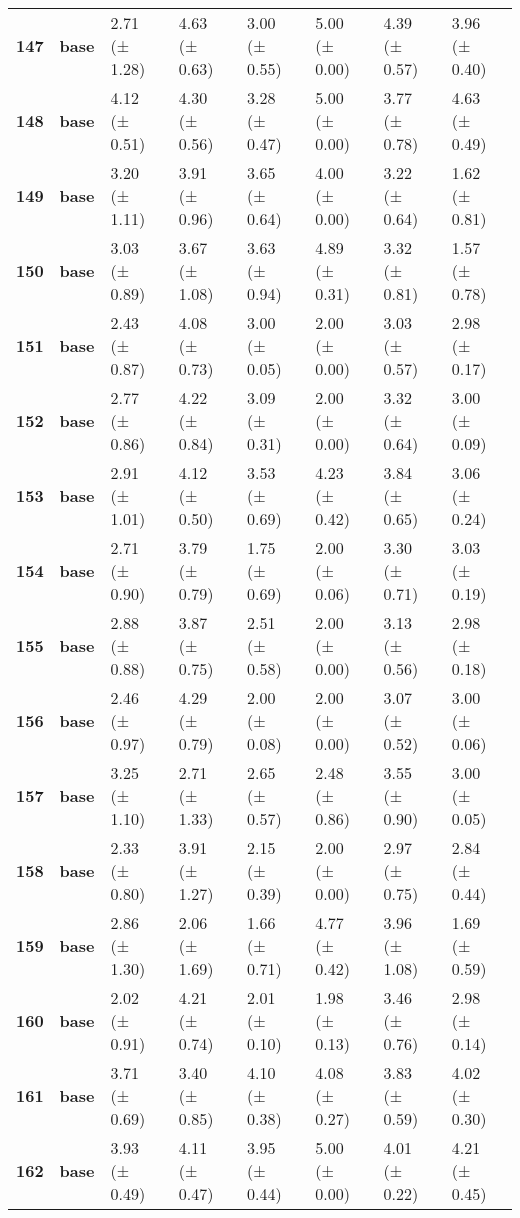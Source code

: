 \begin{longtable}{llllllll}
\cline{1-8}
\textbf{147} & \textbf{base} & 2.71 (± 1.28) & 4.63 (± 0.63) & 3.00 (± 0.55) & 5.00 (± 0.00) & 4.39 (± 0.57) & 3.96 (± 0.40) \\
\cline{1-8}
\textbf{148} & \textbf{base} & 4.12 (± 0.51) & 4.30 (± 0.56) & 3.28 (± 0.47) & 5.00 (± 0.00) & 3.77 (± 0.78) & 4.63 (± 0.49) \\
\cline{1-8}
\textbf{149} & \textbf{base} & 3.20 (± 1.11) & 3.91 (± 0.96) & 3.65 (± 0.64) & 4.00 (± 0.00) & 3.22 (± 0.64) & 1.62 (± 0.81) \\
\cline{1-8}
\textbf{150} & \textbf{base} & 3.03 (± 0.89) & 3.67 (± 1.08) & 3.63 (± 0.94) & 4.89 (± 0.31) & 3.32 (± 0.81) & 1.57 (± 0.78) \\
\cline{1-8}
\textbf{151} & \textbf{base} & 2.43 (± 0.87) & 4.08 (± 0.73) & 3.00 (± 0.05) & 2.00 (± 0.00) & 3.03 (± 0.57) & 2.98 (± 0.17) \\
\cline{1-8}
\textbf{152} & \textbf{base} & 2.77 (± 0.86) & 4.22 (± 0.84) & 3.09 (± 0.31) & 2.00 (± 0.00) & 3.32 (± 0.64) & 3.00 (± 0.09) \\
\cline{1-8}
\textbf{153} & \textbf{base} & 2.91 (± 1.01) & 4.12 (± 0.50) & 3.53 (± 0.69) & 4.23 (± 0.42) & 3.84 (± 0.65) & 3.06 (± 0.24) \\
\cline{1-8}
\textbf{154} & \textbf{base} & 2.71 (± 0.90) & 3.79 (± 0.79) & 1.75 (± 0.69) & 2.00 (± 0.06) & 3.30 (± 0.71) & 3.03 (± 0.19) \\
\cline{1-8}
\textbf{155} & \textbf{base} & 2.88 (± 0.88) & 3.87 (± 0.75) & 2.51 (± 0.58) & 2.00 (± 0.00) & 3.13 (± 0.56) & 2.98 (± 0.18) \\
\cline{1-8}
\textbf{156} & \textbf{base} & 2.46 (± 0.97) & 4.29 (± 0.79) & 2.00 (± 0.08) & 2.00 (± 0.00) & 3.07 (± 0.52) & 3.00 (± 0.06) \\
\cline{1-8}
\textbf{157} & \textbf{base} & 3.25 (± 1.10) & 2.71 (± 1.33) & 2.65 (± 0.57) & 2.48 (± 0.86) & 3.55 (± 0.90) & 3.00 (± 0.05) \\
\cline{1-8}
\textbf{158} & \textbf{base} & 2.33 (± 0.80) & 3.91 (± 1.27) & 2.15 (± 0.39) & 2.00 (± 0.00) & 2.97 (± 0.75) & 2.84 (± 0.44) \\
\cline{1-8}
\textbf{159} & \textbf{base} & 2.86 (± 1.30) & 2.06 (± 1.69) & 1.66 (± 0.71) & 4.77 (± 0.42) & 3.96 (± 1.08) & 1.69 (± 0.59) \\
\cline{1-8}
\textbf{160} & \textbf{base} & 2.02 (± 0.91) & 4.21 (± 0.74) & 2.01 (± 0.10) & 1.98 (± 0.13) & 3.46 (± 0.76) & 2.98 (± 0.14) \\
\cline{1-8}
\textbf{161} & \textbf{base} & 3.71 (± 0.69) & 3.40 (± 0.85) & 4.10 (± 0.38) & 4.08 (± 0.27) & 3.83 (± 0.59) & 4.02 (± 0.30) \\
\cline{1-8}
\textbf{162} & \textbf{base} & 3.93 (± 0.49) & 4.11 (± 0.47) & 3.95 (± 0.44) & 5.00 (± 0.00) & 4.01 (± 0.22) & 4.21 (± 0.45) \\
\cline{1-8}
\end{longtable}
